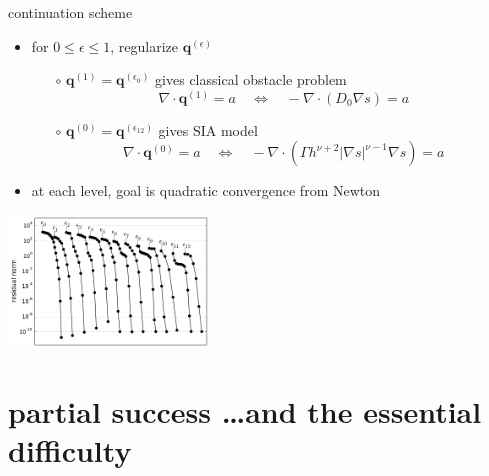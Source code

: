 \documentclass[xcolor={dvipsnames}]{beamer}
\newcommand\bq{\mathbf{q}}
\newcommand\Div{\nabla\cdot}
\newcommand\eps{\epsilon}
\newcommand\grad{\nabla}
\begin{document}
\begin{frame}{continuation scheme}

\begin{itemize}
\item for $0 \le \eps \le 1$, regularize $\bq^{(\eps)}$
  \begin{itemize}
  \item[$\circ$] $\bq^{(1)}=\bq^{(\eps_0)}$ gives classical obstacle problem
    $$\Div \bq^{(1)} = a \quad \iff \quad - \Div (D_0 \grad s) = a$$
  \item[$\circ$] $\bq^{(0)}=\bq^{(\eps_{12})}$ gives SIA model
    $$\Div \bq^{(0)} = a \quad \iff \quad - \Div (\Gamma h^{\nu+2} |\grad s|^{\nu-1} \grad s) = a$$
  \end{itemize}
\item at each level, goal is quadratic convergence from Newton
\end{itemize}

\begin{center}
\includegraphics[width=0.4\textwidth,keepaspectratio=true]{newtonconv}
\end{center}
\end{frame}


\section{partial success \dots and the essential difficulty}
\end{document}
